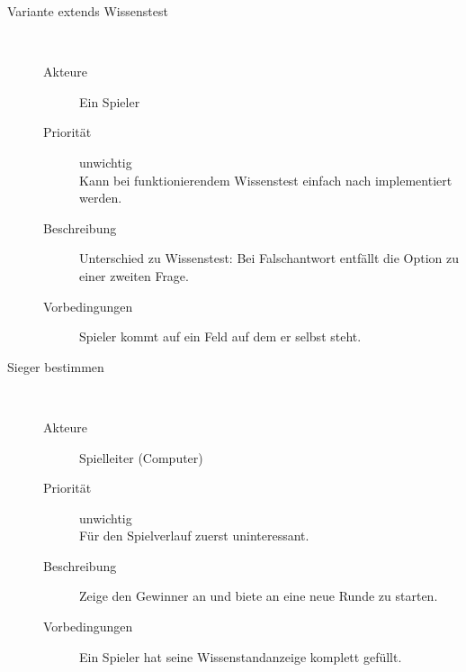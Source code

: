 \documentclass{scrartcl} %
\begin{document}
\begin{description}
   \item[Variante extends Wissenstest]~\par
   \begin{description}
      \item[Akteure] Ein Spieler
      \item[Priorität] unwichtig\\Kann bei funktionierendem Wissenstest einfach nach implementiert werden.
      \item[Beschreibung] Unterschied zu Wissenstest: Bei Falschantwort entfällt die Option zu einer zweiten Frage.
      \item[Vorbedingungen] Spieler kommt auf ein Feld auf dem er selbst steht.
   \end{description}
   

   \item[Sieger bestimmen]~\par
   \begin{description}
      \item[Akteure] Spielleiter (Computer)
      \item[Priorität] unwichtig\\Für den Spielverlauf zuerst uninteressant.
      \item[Beschreibung] Zeige den Gewinner an und biete an eine neue Runde zu starten.
      \item[Vorbedingungen] Ein Spieler hat seine Wissenstandanzeige komplett gefüllt.
   \end{description}
\end{description}
\end{document}

